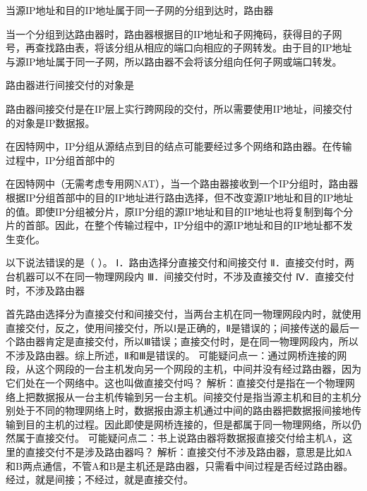 \question 当源IP地址和目的IP地址属于同一子网的分组到达时，路由器
\par{}
\begin{solution}当一个分组到达路由器时，路由器根据目的IP地址和子网掩码，获得目的子网号，再查找路由表，将该分组从相应的端口向相应的子网转发。由于目的IP地址与源IP地址属于同一子网，所以路由器不会将该分组向任何子网或端口转发。
\end{solution}
\question 路由器进行间接交付的对象是
\par{}
\begin{solution}路由器间接交付是在IP层上实行跨网段的交付，所以需要使用IP地址，间接交付的对象是IP数据报。
\end{solution}
\question 在因特网中，IP分组从源结点到目的结点可能要经过多个网络和路由器。在传输过程中，IP分组首部中的
\par{}
\begin{solution}在因特网中（无需考虑专用网NAT），当一个路由器接收到一个IP分组时，路由器根据IP分组首部中的目的IP地址进行路由选择，但不改变源IP地址和目的IP地址的值。即使IP分组被分片，原IP分组的源IP地址和目的IP地址也将复制到每个分片的首部。因此，在整个传输过程中，IP分组中的源IP地址和目的IP地址都不发生变化。
\end{solution}
\question 以下说法错误的是（ ）。 Ⅰ．路由选择分直接交付和间接交付
Ⅱ．直接交付时，两台机器可以不在同一物理网段内
Ⅲ．间接交付时，不涉及直接交付 Ⅳ．直接交付时，不涉及路由器
\par{}
\begin{solution}首先路由选择分为直接交付和间接交付，当两台主机在同一物理网段内时，就使用直接交付，反之，使用间接交付，所以Ⅰ是正确的，Ⅱ是错误的；间接传送的最后一个路由器肯定是直接交付，所以Ⅲ错误；直接交付时，是在同一物理网段内，所以不涉及路由器。综上所述，Ⅱ和Ⅲ是错误的。
可能疑问点一：通过网桥连接的网段，从这个网段的一台主机发向另一个网段的主机，中间并没有经过路由器，因为它们处在一个网络中。这也叫做直接交付吗？
解析：直接交付是指在一个物理网络上把数据报从一台主机传输到另一台主机。间接交付是指当源主机和目的主机分别处于不同的物理网络上时，数据报由源主机通过中间的路由器把数据报间接地传输到目的主机的过程。因此即使是网桥连接的，但是都属于同一物理网络，所以仍然属于直接交付。
可能疑问点二：书上说路由器将数据报直接交付给主机A，这里的直接交付不是涉及路由器吗？
解析：直接交付不涉及路由器，意思是比如A和B两点通信，不管A和B是主机还是路由器，只需看中间过程是否经过路由器。经过，就是间接；不经过，就是直接交付。
\end{solution}

